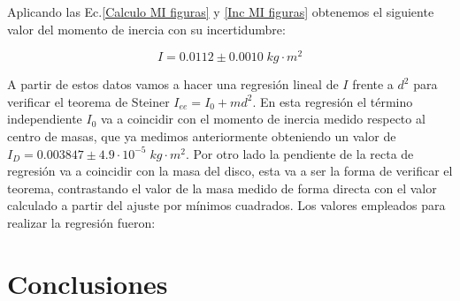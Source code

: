 \documentclass[a4paper,12pt,titlepage]{article}
\begin{document}
Aplicando las Ec.\ref{Calculo MI figuras} y \ref{Inc MI figuras} obtenemos el siguiente valor del momento de inercia con su incertidumbre:

\begin{equation}
    I = 0.0112 \pm 0.0010 \; kg \cdot m^2
\end{equation}

A partir de estos datos vamos a hacer una regresión lineal de $I$ frente a $d^2$ para verificar el teorema de Steiner $I_{ee} = I_0 + md^2$. En esta regresión el término independiente $I_0$ va a coincidir con el momento de inercia medido respecto al centro de masas, que ya medimos anteriormente obteniendo un valor de $I_D = 0.003847 \pm 4.9 \cdot 10^{-5} \; kg\cdot m^2$. Por otro lado la pendiente de la recta de regresión va a coincidir con la masa del disco, esta va a ser la forma de verificar el teorema, contrastando el valor de la masa medido de forma directa con el valor calculado a partir del ajuste por mínimos cuadrados. Los valores empleados para realizar la regresión fueron:







\section{Conclusiones}
\end{document}
